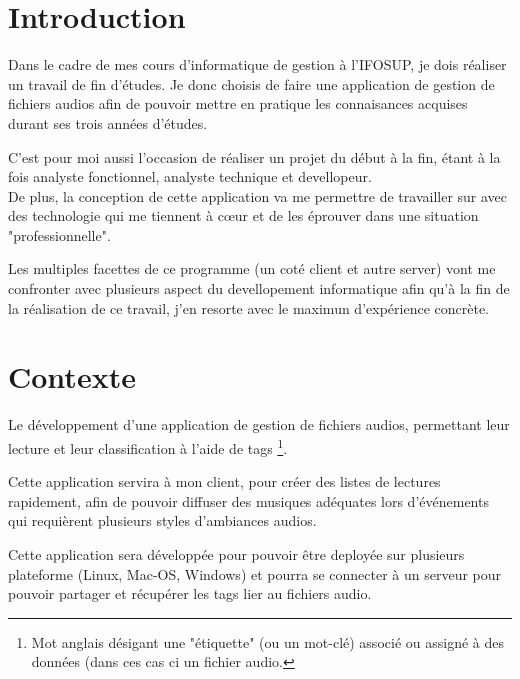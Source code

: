 \documentclass[a4paper,12pt]{report}
\author{Thomas Stassin}
\date{}
\begin{document}


\newpage
\thispagestyle{empty}
\addtocounter{page}{-1}
\null
\newpage



\tableofcontents
\pagebreak

\chapter{Introduction}

Dans le cadre de mes cours d’informatique de gestion à l’IFOSUP, je dois réaliser un travail de fin d’études. Je donc choisis de faire une application de gestion de fichiers audios afin de pouvoir mettre en pratique les connaisances acquises durant ses trois années d'études.

C'est pour moi aussi l'occasion de réaliser un projet du début à la fin, étant à la fois analyste fonctionnel, analyste technique et devellopeur.\\

De plus, la conception de cette application va me permettre de travailler sur avec des technologie qui me tiennent à c\oe{}ur et de les éprouver dans une situation "professionnelle".

Les multiples facettes de ce programme (un coté client et autre server) vont me confronter avec plusieurs aspect du devellopement informatique afin qu'à la fin de la réalisation de ce travail, j'en resorte avec le maximun d'expérience concrète.


\chapter{Contexte}

Le développement d'une application de gestion de fichiers audios, permettant leur lecture et leur classification à l'aide de tags \footnote{Mot anglais désigant une "étiquette" (ou un mot-clé) associé ou assigné à des données (dans ces cas ci un fichier audio.}.

Cette application servira à mon client, pour créer des listes de lectures rapidement, afin de pouvoir diffuser des musiques adéquates lors d'événements qui requièrent plusieurs styles d'ambiances audios.

Cette application sera développée pour pouvoir être deployée sur plusieurs plateforme (Linux, Mac-OS, Windows) et pourra se connecter à un serveur pour pouvoir partager et récupérer les tags lier au fichiers audio.
\end{document}
